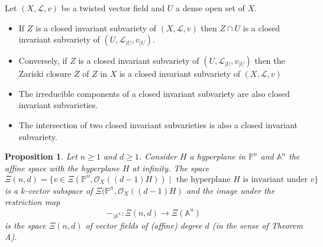 \documentclass[12pt]{amsart}
\renewcommand{\P}{\mathbb{P}}
\theoremstyle{definition}
\theoremstyle{plain}
\newtheorem{proposition}[definition]{Proposition}
\theoremstyle{exampstyle}
\theoremstyle{exampstyle}\newtheorem{thmxbis}{Theorem}
\numberwithin{equation}{section}
\theoremstyle{remark}
\begin{document}
{\remark \label{remark-invariant-restriction} Let $(X,\mathcal L,v)$ be a twisted vector field and $U$ a dense open set of $X$.
\begin{itemize} 
\item[(i)] If $Z$ is a closed invariant subvariety of $(X,\mathcal L, v)$ then $Z \cap U$ is a closed invariant subvariety of $(U,\mathcal L_{\mid U},v_{\mid U})$.
\item[(ii)] Conversely, if $Z$ is a closed invariant subvariety of $(U,\mathcal L_{\mid U},v_{\mid U})$ then the Zariski closure $\overline{Z}$ of $Z$ in $X$ is a closed invariant subvariety of $(X,\mathcal L,v)$ 
\item[(iii)] The irreducible components of a closed invariant subvariety are also closed invariant subvarieties.
\item[(iv)] The intersection of two closed invariant subvarieties is also a closed invariant subvariety.
\end{itemize}}


\begin{proposition} \label{proposition-affine-degree}
Let $n \geq 1$ and $d \geq 1$. Consider $H$ a hyperplane in $\P^n$ and $\mathbb{A}^n$ the affine space with the hyperplane $H$ at infinity. The space  
$$\overline{\Xi}(n,d) = \lbrace v \in \Xi(\P^n, \mathcal O_X((d-1)H)) \mid  \text{ the hyperplane } H \text{ is invariant under } v \rbrace$$
is a $k$-vector subspace of $\Xi(\P^n,\mathcal O_X((d-1)H)$ and the image under the restriction map 
$$-_{\mid \mathbb{A}^n}: \overline{\Xi}(n,d) \rightarrow \Xi(\mathbb{A}^n)  $$
is the space $\Xi(n,d)$ of vector fields of (affine) degree $d$ (in the sense of Theorem A).
\end{proposition} 
\end{document}

